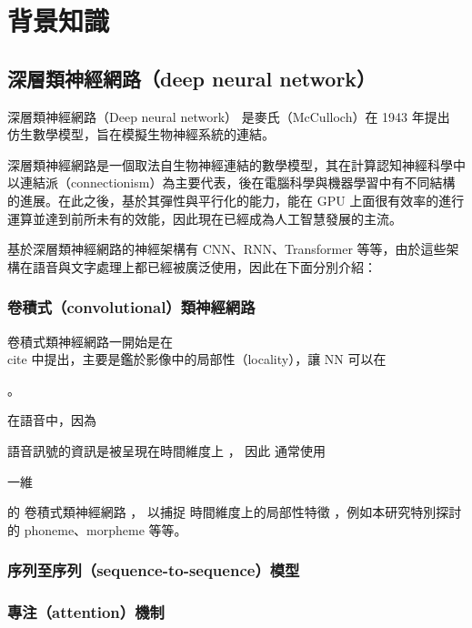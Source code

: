 \chapter{背景知識}

\section{深層類神經網路（deep neural network）}

深層類神經網路（Deep neural network） 是麥氏（McCulloch）在 1943 年提出 \cite{mcculloch1943logical} 仿生數學模型，旨在模擬生物神經系統的連結。

深層類神經網路是一個取法自生物神經連結的數學模型，其在計算認知神經科學中以連結派（connectionism）為主要代表，後在電腦科學與機器學習中有不同結構的進展。在此之後，基於其彈性與平行化的能力，能在 GPU 上面很有效率的進行運算並達到前所未有的效能，因此現在已經成為人工智慧發展的主流。

基於深層類神經網路的神經架構有 CNN、RNN、Transformer 等等，由於這些架構在語音與文字處理上都已經被廣泛使用，因此在下面分別介紹：


\subsection{卷積式（convolutional）類神經網路}

卷積式類神經網路一開始是在 \\cite{} 中提出，主要是鑑於影像中的局部性（locality），讓 NN 可以在

。

在語音中，因為

語音訊號的資訊是被呈現在時間維度上
，
因此
通常使用

一維

的
卷積式類神經網路
，
以捕捉
時間維度上的局部性特徵
，例如本研究特別探討的 phoneme、morpheme 等等。




\subsection{
    序列至序列（sequence-to-sequence）模型}

    


\subsection{專注（attention）機制}    


